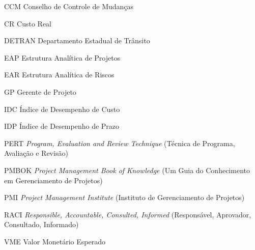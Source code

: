 \documentclass[
	12pt,				%
	openright,			%
	twoside,			%
	a4paper,			%
	final,
    french,             %
	spanish,			%
	english,			%
	brazil				%
	]{abntex2}
\newcommand\foreign[1]{\emph{#1}}
\begin{document}
\begin{siglas}
	\item[CCM] Conselho de Controle de Mudanças
	\item[CR] Custo Real
	\item[DETRAN] Departamento Estadual de Trânsito
	\item[EAP] Estrutura Analítica de Projetos
	\item[EAR] Estrutura Analítica de Riscos
	\item[GP] Gerente de Projeto
	\item[IDC] Índice de Desempenho de Custo
	\item[IDP] Índice de Desempenho de Prazo
	\item[PERT] \foreign{Program, Evaluation and Review Technique} (Técnica de Programa, Avaliação e Revisão)
	\item[PMBOK] \foreign{Project Management Book of Knowledge} (Um Guia do Conhecimento em Gerenciamento de Projetos)
	\item[PMI] \foreign{Project Management Institute} (Instituto de Gerenciamento de Projetos)
	\item[RACI] \foreign{Responsible, Accountable, Consulted, Informed} (Responsável, Aprovador, Consultado, Informado)
	\item[VME] Valor Monetário Esperado
	 
\end{siglas}


\tableofcontents*
\cleardoublepage

\textual







\end{document}

